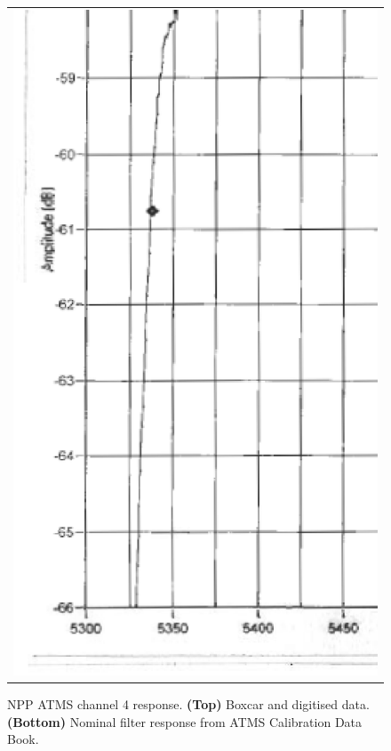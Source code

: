 \begin{figure}[H]
\begin{tabular}{c}
    \includegraphics[bb=249 194 1431 1035,scale=0.3]{graphics/log_book/ch4.eps}
  \end{tabular}
  \caption{NPP ATMS channel 4 response. \textbf{(Top)} Boxcar and digitised data. \textbf{(Bottom)} Nominal filter response from ATMS Calibration Data Book\cite{ATMS_PFM_CalLog}.}
  \label{fig:atms_npp.ch4.srf}
\end{figure}

